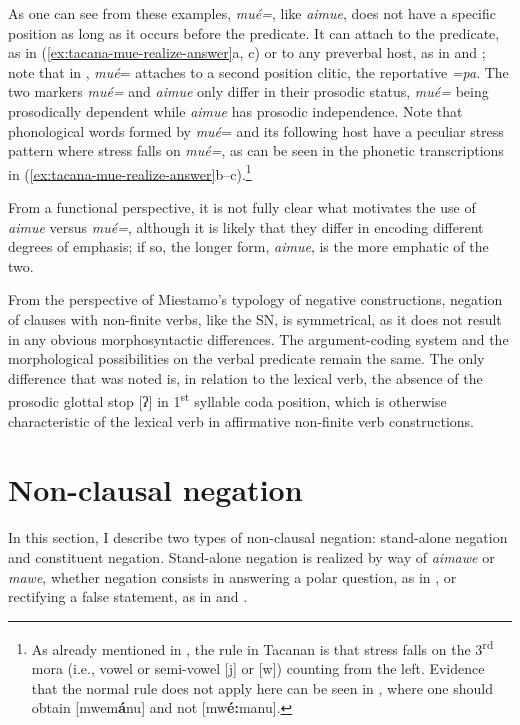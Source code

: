 \documentclass[output=paper,draft,draftmode,colorlinks,citecolor=brown]{langscibook}
\begin{document}
\largerpage
As one can see from these examples, \textit{mué=}, like \textit{aimue},
does not have a specific position as long as it occurs before the
predicate. It can attach to the predicate, as in
(\ref{ex:tacana-mue-realize-answer}a, c)
or to any preverbal host, as in
 and ; note that in
, \textit{mué}= attaches to a second position clitic,
the reportative \textit{=pa}. The two markers \textit{mué=} and
\textit{aimue} only differ in their prosodic status, \textit{mué=} being
prosodically dependent while \textit{aimue} has prosodic independence. Note
that phonological words formed by \textit{mué}= and its following host have
a peculiar stress pattern where stress falls on \textit{mué=}, as can be
seen in the phonetic transcriptions in
(\ref{ex:tacana-mue-realize-answer}b--c).\footnote{As already mentioned in  , the rule in Tacanan is that
stress falls on the 3\textsuperscript{rd} mora (i.e., vowel or semi-vowel
[j] or [w]) counting from the left. Evidence that the normal rule does not
apply here can be seen in , where one should obtain [mwem\textbf{á}nu] and not [mw\textbf{é:}manu].} 

From a functional perspective, it is not fully clear what motivates the use
of \textit{aimue} versus \textit{mué=}, although it is likely that they
differ in encoding different degrees of emphasis; if so, the longer form, \textit{aimue}, is the more emphatic of the two.

From the perspective of Miestamo's \parencites*{Miestamo2005}{Miestamo2007}
typology of negative constructions, negation of clauses with non-finite
verbs, like the SN, is symmetrical, as it does not result in any obvious
morphosyntactic differences. The argument-coding system and the
morphological possibilities on the verbal predicate remain the same. The
only difference that was noted is, in relation to the lexical verb, the absence of the prosodic glottal stop [ʔ] in 1\textsuperscript{st} syllable coda position, which is otherwise characteristic of the lexical verb in affirmative non-finite verb constructions.

\section{Non-clausal negation}\label{sec:tacana-7}

In this section, I describe two types of non-clausal negation: stand-alone
negation and constituent negation. Stand-alone negation is
realized by way of \textit{aimawe} or \textit{mawe}, whether negation
consists in answering a polar question, as in
, or rectifying a false statement, as in
 and .
\end{document}
